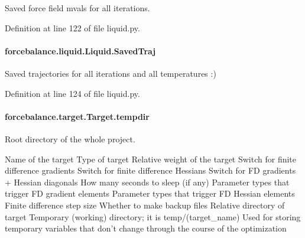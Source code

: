 Saved force field mvals for all iterations. 



Definition at line 122 of file liquid.\-py.

\hypertarget{classforcebalance_1_1liquid_1_1Liquid_a0da0c00cdc193c9c470d7e528043fb99}{
\paragraph[{Saved\-Traj}]{\setlength{\rightskip}{0pt plus 5cm}forcebalance.\-liquid.\-Liquid.\-Saved\-Traj\hspace{0.3cm}{\ttfamily [inherited]}}}\label{classforcebalance_1_1liquid_1_1Liquid_a0da0c00cdc193c9c470d7e528043fb99}


Saved trajectories for all iterations and all temperatures \-:) 



Definition at line 124 of file liquid.\-py.

\hypertarget{classforcebalance_1_1target_1_1Target_aa1f01b5b78db253b5b66384ed11ed193}{
\paragraph[{tempdir}]{\setlength{\rightskip}{0pt plus 5cm}forcebalance.\-target.\-Target.\-tempdir\hspace{0.3cm}{\ttfamily [inherited]}}}\label{classforcebalance_1_1target_1_1Target_aa1f01b5b78db253b5b66384ed11ed193}


Root directory of the whole project. 

Name of the target Type of target Relative weight of the target Switch for finite difference gradients Switch for finite difference Hessians Switch for F\-D gradients + Hessian diagonals How many seconds to sleep (if any) Parameter types that trigger F\-D gradient elements Parameter types that trigger F\-D Hessian elements Finite difference step size Whether to make backup files Relative directory of target Temporary (working) directory; it is temp/(target\-\_\-name) Used for storing temporary variables that don't change through the course of the optimization 


